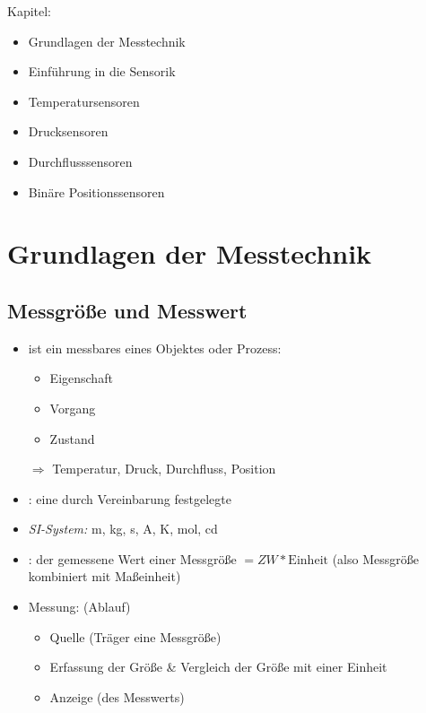 Kapitel:
\begin{itemize}
\item Grundlagen der Messtechnik
\item Einführung in die Sensorik
\item Temperatursensoren
\item Drucksensoren
\item Durchflusssensoren
\item Binäre Positionssensoren
\end{itemize}

\chapter{Grundlagen der Messtechnik}

\section{Messgröße und Messwert}

\begin{itemize}
\item {} ist ein messbares  eines Objektes oder Prozess:
\begin{itemize}
\item Eigenschaft 
\item Vorgang
\item Zustand
\end{itemize}
$\Rightarrow$ Temperatur, Druck, Durchfluss, Position
\item {}: eine durch Vereinbarung festgelegte 
\item \emph{SI-System:} m, kg, s, A, K, mol, cd
\item {}: der gemessene Wert einer Messgröße 
$=ZW * \mathrm{Einheit}$ 
(also Messgröße kombiniert mit Maßeinheit)
\item Messung: (Ablauf)
\begin{itemize}
\item Quelle (Träger eine Messgröße)
\item Erfassung der Größe \& Vergleich der Größe mit einer Einheit
\item Anzeige (des Messwerts)
\end{itemize}
\end{itemize}

